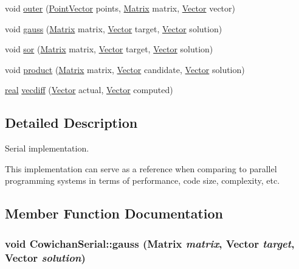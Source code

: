 \begin{CompactItemize}
void \hyperlink{class_cowichan_serial_05f6899081a457d58978e4f6bda2db6a}{outer} (\hyperlink{class_point}{PointVector} points, \hyperlink{cowichan_8hpp_3fb46f939e55c239fbc95656fc0f3399}{Matrix} matrix, \hyperlink{cowichan_8hpp_02bc1553e241b9b33408482658b3c355}{Vector} vector)
\item 
void \hyperlink{class_cowichan_serial_b196d2384c2fe8b185e6269a050399eb}{gauss} (\hyperlink{cowichan_8hpp_3fb46f939e55c239fbc95656fc0f3399}{Matrix} matrix, \hyperlink{cowichan_8hpp_02bc1553e241b9b33408482658b3c355}{Vector} target, \hyperlink{cowichan_8hpp_02bc1553e241b9b33408482658b3c355}{Vector} solution)
\item 
void \hyperlink{class_cowichan_serial_6e8b06711d976de1adc1e4dc81e560e5}{sor} (\hyperlink{cowichan_8hpp_3fb46f939e55c239fbc95656fc0f3399}{Matrix} matrix, \hyperlink{cowichan_8hpp_02bc1553e241b9b33408482658b3c355}{Vector} target, \hyperlink{cowichan_8hpp_02bc1553e241b9b33408482658b3c355}{Vector} solution)
\item 
void \hyperlink{class_cowichan_serial_00411b35445d7d3038b96d53e43bdffa}{product} (\hyperlink{cowichan_8hpp_3fb46f939e55c239fbc95656fc0f3399}{Matrix} matrix, \hyperlink{cowichan_8hpp_02bc1553e241b9b33408482658b3c355}{Vector} candidate, \hyperlink{cowichan_8hpp_02bc1553e241b9b33408482658b3c355}{Vector} solution)
\item 
\hyperlink{cowichan_8hpp_4d521b2c54a1f6312cc8fa04827eaf98}{real} \hyperlink{class_cowichan_serial_34b75a2084051b3677071bb3c334d1f4}{vecdiff} (\hyperlink{cowichan_8hpp_02bc1553e241b9b33408482658b3c355}{Vector} actual, \hyperlink{cowichan_8hpp_02bc1553e241b9b33408482658b3c355}{Vector} computed)
\end{CompactItemize}


\subsection{Detailed Description}
Serial implementation. 

This implementation can serve as a reference when comparing to parallel programming systems in terms of performance, code size, complexity, etc. 

\subsection{Member Function Documentation}
\hypertarget{class_cowichan_serial_b196d2384c2fe8b185e6269a050399eb}{
\subsubsection[{gauss}]{\setlength{\rightskip}{0pt plus 5cm}void CowichanSerial::gauss ({\bf Matrix} {\em matrix}, \/  {\bf Vector} {\em target}, \/  {\bf Vector} {\em solution})}}
\label{class_cowichan_serial_b196d2384c2fe8b185e6269a050399eb}


